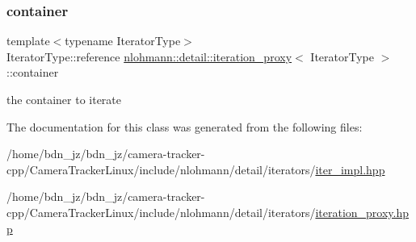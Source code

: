 \subsubsection{\texorpdfstring{container}{container}}
{\footnotesize\ttfamily template$<$typename Iterator\+Type$>$ \\
Iterator\+Type\+::reference \hyperlink{classnlohmann_1_1detail_1_1iteration__proxy}{nlohmann\+::detail\+::iteration\+\_\+proxy}$<$ Iterator\+Type $>$\+::container\hspace{0.3cm}{\ttfamily [private]}}



the container to iterate 



The documentation for this class was generated from the following files\+:\begin{DoxyCompactItemize}
\item 
/home/bdn\+\_\+jz/bdn\+\_\+jz/camera-\/tracker-\/cpp/\+Camera\+Tracker\+Linux/include/nlohmann/detail/iterators/\hyperlink{iter__impl_8hpp}{iter\+\_\+impl.\+hpp}\item 
/home/bdn\+\_\+jz/bdn\+\_\+jz/camera-\/tracker-\/cpp/\+Camera\+Tracker\+Linux/include/nlohmann/detail/iterators/\hyperlink{iteration__proxy_8hpp}{iteration\+\_\+proxy.\+hpp}\end{DoxyCompactItemize}
